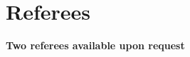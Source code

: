 \documentclass[a4,11pt]{article}
\begin{document}
\section{Referees}
\begin{itemize}[leftmargin=0.15in, label={}]
  \small{\item{\textbf{Two referees available upon request}}}
\end{itemize}


\end{document}
